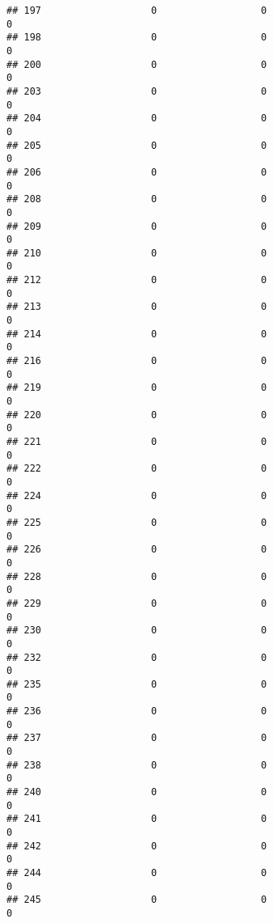 \documentclass[
]{article}
\begin{document}
\begin{verbatim}
## 197                   0                  0                              0
## 198                   0                  0                              0
## 200                   0                  0                              0
## 203                   0                  0                              0
## 204                   0                  0                              0
## 205                   0                  0                              0
## 206                   0                  0                              0
## 208                   0                  0                              0
## 209                   0                  0                              0
## 210                   0                  0                              0
## 212                   0                  0                              0
## 213                   0                  0                              0
## 214                   0                  0                              0
## 216                   0                  0                              0
## 219                   0                  0                              0
## 220                   0                  0                              0
## 221                   0                  0                              0
## 222                   0                  0                              0
## 224                   0                  0                              0
## 225                   0                  0                              0
## 226                   0                  0                              0
## 228                   0                  0                              0
## 229                   0                  0                              0
## 230                   0                  0                              0
## 232                   0                  0                              0
## 235                   0                  0                              0
## 236                   0                  0                              0
## 237                   0                  0                              0
## 238                   0                  0                              0
## 240                   0                  0                              0
## 241                   0                  0                              0
## 242                   0                  0                              0
## 244                   0                  0                              0
## 245                   0                  0                              0

\end{verbatim}
\end{document}
